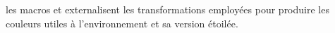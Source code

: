 

\begin{bdoctopic}
    les macros  et  externalisent les transformations employées pour produire les couleurs utiles à l'environnement  et sa version étoilée.
\end{bdoctopic}
